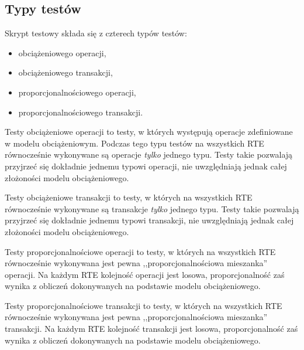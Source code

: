 \subsection{Typy testów}\label{sect:testtypes}
Skrypt testowy składa się z czterech typów testów:
\begin{itemize}
\item obciążeniowego operacji,
\item obciążeniowego transakcji,
\item proporcjonalnościowego operacji,
\item proporcjonalnościowego transakcji.
\end{itemize}

Testy obciążeniowe operacji to testy, w których występują operacje zdefiniowane w modelu obciążeniowym.
Podczas tego typu testów na wszystkich RTE równocześnie wykonywane są operacje \textit{tylko} jednego typu.
Testy takie pozwalają przyjrzeć się dokładnie jednemu typowi operacji, nie uwzględniają jednak całej złożoności
modelu obciążeniowego.

Testy obciążeniowe transakcji to testy, w których na wszystkich RTE równocześnie wykonywane są transakcje \textit{tylko} jednego typu.
Testy takie pozwalają przyjrzeć się dokładnie jednemu typowi transakcji, nie uwzględniają jednak całej złożoności
modelu obciążeniowego.

Testy proporcjonalnościowe operacji to testy, w których na wszystkich RTE równocześnie wykonywana jest pewna 
,,proporcjonalnościowa mieszanka'' operacji. Na każdym RTE kolejność operacji jest losowa, proporcjonalność zaś
wynika z obliczeń dokonywanych na podstawie modelu obciążeniowego.

Testy proporcjonalnościowe transakcji to testy, w których na wszystkich RTE równocześnie wykonywana jest pewna 
,,proporcjonalnościowa mieszanka'' transakcji. Na każdym RTE kolejność transakcji jest losowa, proporcjonalność zaś
wynika z obliczeń dokonywanych na podstawie modelu obciążeniowego.

